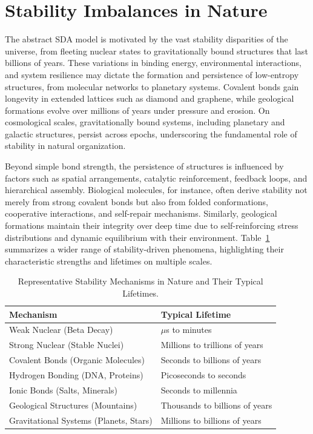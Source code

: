 \documentclass[preprint,12pt]{elsarticle}
\begin{document}

\appendix

\section{Stability Imbalances in Nature}

The abstract SDA model is motivated by the vast stability disparities of the universe, from fleeting nuclear states to gravitationally bound structures that last billions of years. These variations in binding energy, environmental interactions, and system resilience may dictate the formation and persistence of low-entropy structures, from molecular networks to planetary systems. Covalent bonds gain longevity in extended lattices such as diamond and graphene, while geological formations evolve over millions of years under pressure and erosion. On cosmological scales, gravitationally bound systems, including planetary and galactic structures, persist across epochs, underscoring the fundamental role of stability in natural organization.

Beyond simple bond strength, the persistence of structures is influenced by factors such as spatial arrangements, catalytic reinforcement, feedback loops, and hierarchical assembly. Biological molecules, for instance, often derive stability not merely from strong covalent bonds but also from folded conformations, cooperative interactions, and self-repair mechanisms. Similarly, geological formations maintain their integrity over deep time due to self-reinforcing stress distributions and dynamic equilibrium with their environment. Table~\ref{tab:binding-forces} summarizes a wider range of stability-driven phenomena, highlighting their characteristic strengths and lifetimes on multiple scales.


\begin{table}
\centering
\caption{Representative Stability Mechanisms in Nature and Their Typical Lifetimes.}
\label{tab:binding-forces}
\begin{tabular}{l l}
\toprule
\textbf{Mechanism} & \textbf{Typical Lifetime} \\
\midrule
Weak Nuclear (Beta Decay) & $\mu$s to minutes \\
Strong Nuclear (Stable Nuclei) & Millions to trillions of years \\
Covalent Bonds (Organic Molecules) & Seconds to billions of years \\
Hydrogen Bonding (DNA, Proteins) & Picoseconds to seconds \\
Ionic Bonds (Salts, Minerals) & Seconds to millennia \\
Geological Structures (Mountains) & Thousands to billions of years \\
Gravitational Systems (Planets, Stars) & Millions to billions of years \\
\bottomrule
\end{tabular}
\end{table}
\end{document}
